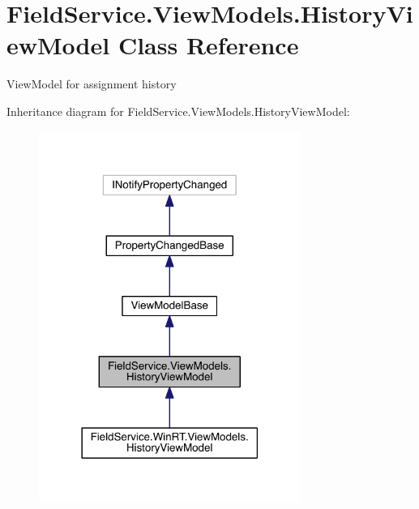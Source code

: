\hypertarget{class_field_service_1_1_view_models_1_1_history_view_model}{\section{Field\+Service.\+View\+Models.\+History\+View\+Model Class Reference}
\label{class_field_service_1_1_view_models_1_1_history_view_model}
}


View\+Model for assignment history  




Inheritance diagram for Field\+Service.\+View\+Models.\+History\+View\+Model\+:
\nopagebreak
\begin{figure}[H]
\begin{center}
\leavevmode
\includegraphics[width=242pt]{class_field_service_1_1_view_models_1_1_history_view_model__inherit__graph}
\end{center}
\end{figure}


